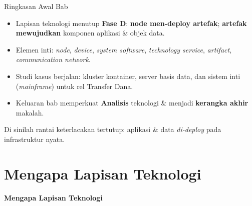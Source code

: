 \documentclass[aspectratio=169, table]{beamer}
\newcommand{\sectionframe}[1]{%
  \begin{frame}{\hfill}
    \centering
    \Huge{\textbf{#1}}
  \end{frame}
}
\newcommand{\takeaway}[1]{%
  \vspace{4pt}
  {\footnotesize #1}
}
\begin{document}
\begin{frame}{Ringkasan Awal Bab}
  \vspace{6pt}
  \begin{itemize}
    \item Lapisan teknologi menutup \textbf{Fase D}: \textbf{node men-deploy
          artefak}; \textbf{artefak mewujudkan} komponen aplikasi \& objek data.
    \item Elemen inti: \emph{node}, \emph{device}, \emph{system software},
          \emph{technology service}, \emph{artifact}, \emph{communication network}.
    \item Studi kasus berjalan: kluster kontainer, server basis data, dan sistem
          inti (\emph{mainframe}) untuk rel Transfer Dana.
    \item Keluaran bab memperkuat \textbf{Analisis} teknologi \& menjadi
          \textbf{kerangka akhir} makalah.
  \end{itemize}
  \takeaway{Di sinilah rantai keterlacakan tertutup: aplikasi \& data
  \emph{di-deploy} pada infrastruktur nyata.}
\end{frame}

\section{Mengapa Lapisan Teknologi}
\sectionframe{Mengapa Lapisan Teknologi}
\end{document}
